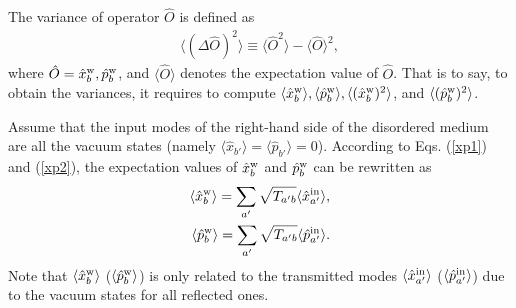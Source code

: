 \documentclass[9pt,twocolumn,twoside]{osajnl}
\begin{document}
The variance of operator $\hat{O}$ is defined as
\begin{align}
\label{var20}
\langle (\Delta \hat{O})^2 \rangle \equiv \langle \hat{O}^2 \rangle - \langle \hat{O} \rangle^2,
\end{align}
where $\hat{O} = \hat{x}_b^{\rm{w}},\hat{p}_b^{\rm{w}}$, and $\langle \hat{O} \rangle$ denotes the expectation value of $\hat{O}$. That is to say, to obtain the variances, it requires to compute $\langle \hat{x}_b^{\rm{w}} \rangle, \langle \hat{p}_b^{\rm{w}} \rangle, \langle (\hat{x}_b^{\rm{w}})^2 \rangle$, and $\langle (\hat{p}_b^{\rm{w}})^2 \rangle$.

Assume that the input modes of the right-hand side of the disordered medium are all the vacuum states (namely $\langle \hat{x}_{b'}\rangle = \langle \hat{p}_{b'}\rangle = 0$). According to Eqs. (\ref{xp1}) and (\ref{xp2}), the expectation values of $\hat{x}_b^{\rm{w}}$ and $\hat{p}_b^{\rm{w}}$ can be rewritten as
\begin{align}
\label{var2a}
\langle \hat{x}_b^{\rm{w}} \rangle = \sum_{a'}{\sqrt{T_{a'b}}  \langle \hat{x}_{a'}^{\rm{in}} \rangle}, \\ \nonumber
\langle \hat{p}_b^{\rm{w}} \rangle = \sum_{a'}{\sqrt{T_{a'b}}  \langle \hat{p}_{a'}^{\rm{in}} \rangle}.
\end{align}
Note that $\langle \hat{x}_b^{\rm{w}} \rangle$ ($\langle \hat{p}_b^{\rm{w}} \rangle$) is only related to the transmitted modes $\langle \hat{x}_{a'}^{\rm{in}} \rangle$ ($\langle \hat{p}_{a'}^{\rm{in}} \rangle$) due to the vacuum states for all reflected ones. 
\end{document}
